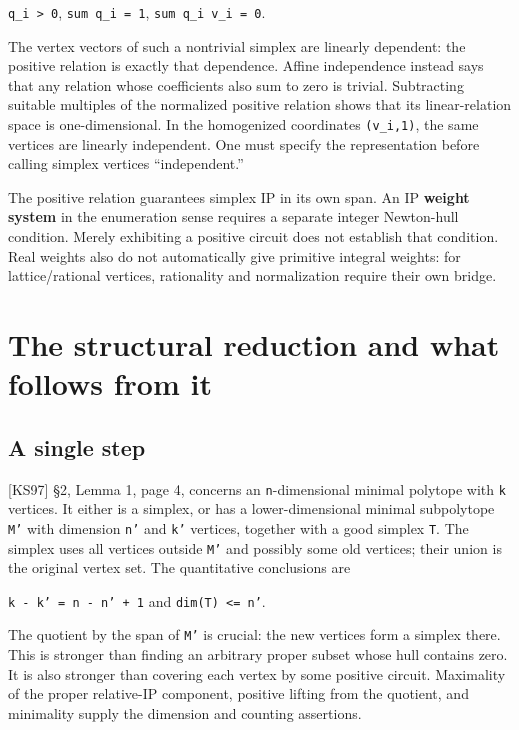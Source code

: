\documentclass[11pt,a4paper,oneside]{report}
\begin{document}
\texttt{q\_\allowbreak{}i > 0},
\texttt{sum q\_\allowbreak{}i =\allowbreak{} 1},
\texttt{sum q\_\allowbreak{}i v\_\allowbreak{}i =\allowbreak{} 0}.

The vertex vectors of such a nontrivial simplex are linearly dependent:
the positive relation is exactly that dependence. Affine independence
instead says that any relation whose coefficients also sum to zero is
trivial. Subtracting suitable multiples of the normalized positive
relation shows that its linear-relation space is one-dimensional. In the
homogenized coordinates
\texttt{(\allowbreak{}v\_\allowbreak{}i,\allowbreak{}1)}, the same
vertices are linearly independent. One must specify the representation
before calling simplex vertices ``independent.''

The positive relation guarantees simplex IP in its own span. An IP
\textbf{weight system} in the enumeration sense requires a separate
integer Newton-hull condition. Merely exhibiting a positive circuit does
not establish that condition. Real weights also do not automatically
give primitive integral weights: for lattice/rational vertices,
rationality and normalization require their own bridge.

\section{The structural reduction and what follows from
it}\label{minimal-ip-circuits-and-types--the-structural-reduction-and-what-follows-from-it}

\subsection{A single
step}\label{minimal-ip-circuits-and-types--a-single-step}

{[}KS97{]} §2, Lemma 1, page 4, concerns an \texttt{n}-dimensional
minimal polytope with \texttt{k} vertices. It either is a simplex, or
has a lower-dimensional minimal subpolytope \texttt{M'} with dimension
\texttt{n'} and \texttt{k'} vertices, together with a good simplex
\texttt{T}. The simplex uses all vertices outside \texttt{M'} and
possibly some old vertices; their union is the original vertex set. The
quantitative conclusions are

\texttt{k -\allowbreak{} k' =\allowbreak{} n -\allowbreak{} n' + 1} and
\texttt{dim(\allowbreak{}T)\allowbreak{} <=\allowbreak{} n'}.

The quotient by the span of \texttt{M'} is crucial: the new vertices
form a simplex there. This is stronger than finding an arbitrary proper
subset whose hull contains zero. It is also stronger than covering each
vertex by some positive circuit. Maximality of the proper relative-IP
component, positive lifting from the quotient, and minimality supply the
dimension and counting assertions.
\end{document}
